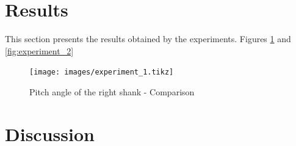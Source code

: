 \section{Results}

This section presents the results obtained by the experiments. Figures \ref{fig:experiment_1} and \ref{fig:experiment_2}

\begin{figure}
	\centering
	\newlength\figureheight 
	\newlength\figurewidth 
	\setlength\figureheight{7cm} 
	\setlength\figurewidth{\textwidth}
	\texttt{[image: images/experiment\_1.tikz]}
	\caption{Pitch angle of the right shank - Comparison}
	\label{fig:experiment_1}
\end{figure}

%

\section{Discussion}

